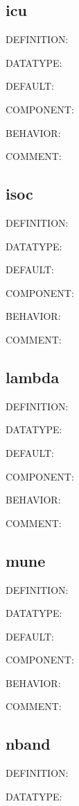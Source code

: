\subsection{icu}
{\color{red}DEFINITION:}

{\color{green}DATATYPE:}

{\color{blue}DEFAULT:}

{\color{brown}COMPONENT:}

{\color{purple}BEHAVIOR:}

{\color{olive}COMMENT:}

\subsection{isoc}
{\color{red}DEFINITION:}

{\color{green}DATATYPE:}

{\color{blue}DEFAULT:}

{\color{brown}COMPONENT:}

{\color{purple}BEHAVIOR:}

{\color{olive}COMMENT:}

\subsection{lambda}
{\color{red}DEFINITION:}

{\color{green}DATATYPE:}

{\color{blue}DEFAULT:}

{\color{brown}COMPONENT:}

{\color{purple}BEHAVIOR:}

{\color{olive}COMMENT:}

\subsection{mune}
{\color{red}DEFINITION:}

{\color{green}DATATYPE:}

{\color{blue}DEFAULT:}

{\color{brown}COMPONENT:}

{\color{purple}BEHAVIOR:}

{\color{olive}COMMENT:}

\subsection{nband}
{\color{red}DEFINITION:}

{\color{green}DATATYPE:}

